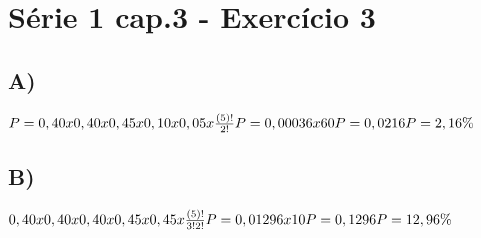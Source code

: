 \documentclass{article}
\begin{document}
    \section*{Série 1 cap.3 - Exercício 3}

    \subsection{A)}
    $P = 0,40 x 0,40 x 0,45 x 0,10 x 0,05 x \frac{(5)!}{2!}
    \newline
    P = 0,00036 x 60
    \newline
    P = 0,0216 
    \newline
    P = 2,16\%$
    
    \subsection{B)}
    $0,40 x 0,40 x 0,40 x 0,45 x 0,45 x \frac{(5)!}{3!2!}
    \newline
    P = 0,01296 x 10
    \newline
    P = 0,1296
    \newline
    P = 12,96\%$
\end{document}
